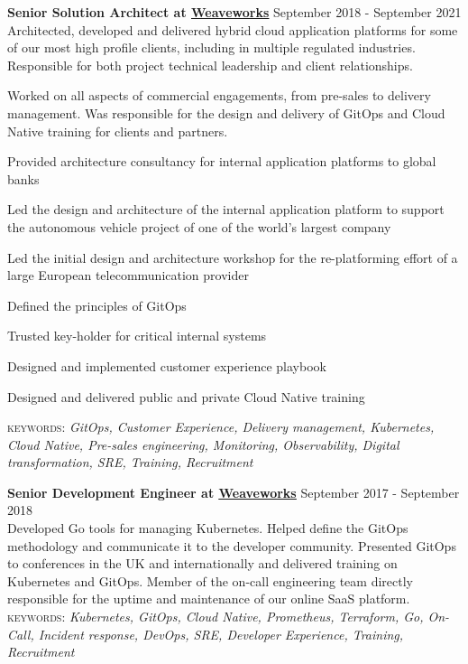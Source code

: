 \documentclass[10pt]{article}
\newcommand{\linkto}[2]{\href{#1}{\color{darkblue}\setulcolor{darkblue}\ul{#2}}}
\newcommand{\blankline}{\quad\pagebreak[2]}
\begin{document}
\blankline

\textbf{Senior Solution Architect at \linkto{https://weave.works}{Weaveworks}} \hfill September 2018 - September 2021\\
Architected, developed and delivered hybrid cloud application platforms for some of our most high profile clients, including in multiple regulated industries. Responsible for both project technical leadership and client relationships. 

\blankline 

Worked on all aspects of commercial engagements, from pre-sales to delivery management. Was responsible for the design and delivery of GitOps and Cloud Native training for clients and partners. 

\begin{myitemize}
        \item Provided architecture consultancy for internal application platforms to global banks
        \item Led the design and architecture of the internal application platform to support the autonomous vehicle project of one of the world's largest company 
        \item Led the initial design and architecture workshop for the re-platforming effort of a large European telecommunication provider
        \item Defined the principles of GitOps
        \item Trusted key-holder for critical internal systems
        \item Designed and implemented customer experience playbook
        \item Designed and delivered public and private Cloud Native training
\end{myitemize}
{\small \textsc{keywords:} \emph{GitOps, Customer Experience, Delivery management, Kubernetes, Cloud Native, Pre-sales engineering, Monitoring, Observability, Digital transformation, SRE, Training, Recruitment}}

\blankline

\textbf{Senior Development Engineer at \linkto{https://weave.works}{Weaveworks}} \hfill September 2017 - September 2018\\
Developed Go tools for managing Kubernetes. Helped define the GitOps methodology and communicate it to the developer community. Presented GitOps to conferences in the UK and internationally and delivered training on Kubernetes and GitOps. Member of the on-call engineering team directly responsible for the uptime and maintenance of our online SaaS platform.\\
{\small \textsc{keywords:} \emph{Kubernetes, GitOps, Cloud Native, Prometheus, Terraform, Go, On-Call, Incident response, DevOps, SRE, Developer Experience, Training, Recruitment}}
\end{document}
